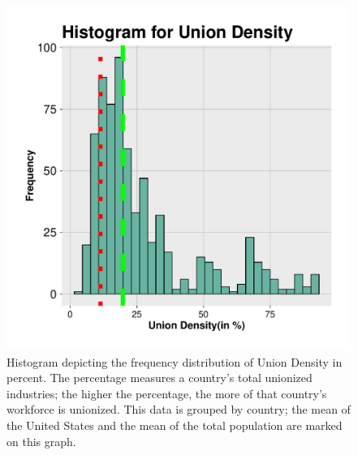 \documentclass[11pt]{article}\usepackage[]{graphicx}\usepackage[]{xcolor}
\newenvironment{knitrout}{}{} %
\begin{document}
\begin{figure}[h]
\centering
  \begin{minipage}{0.7\linewidth}
\begin{knitrout}
\color{fgcolor}

{\centering \includegraphics[width=0.7\linewidth]{figure/UnionDensity-1} 

}


\end{knitrout}
  \caption{Histogram depicting the frequency distribution of Union Density in percent. The percentage measures a country's total unionized industries; the higher the percentage, the more of that country's workforce is unionized. This data is grouped by country; the mean of the United States and the mean of the total population are marked on this graph.} 
  \label{fig:6}
  \end{minipage}
\end{figure}
\end{document}
